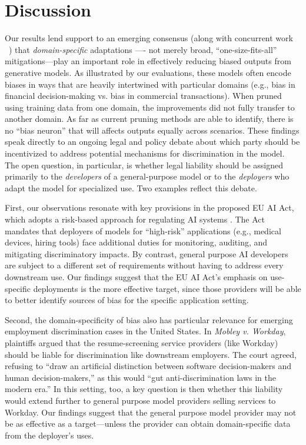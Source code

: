 \documentclass[11pt]{article}
\begin{document}

 









    
\section{Discussion}    

Our results lend support to an emerging consensus (along with concurrent work ~\cite{durmus2024steering}) that \emph{domain-specific} adaptations ---- not merely broad, ``one-size-fits-all'' mitigations---play an important role in effectively reducing biased outputs from generative models.
As illustrated by our evaluations, these models often encode biases in ways that are heavily intertwined with particular domains (e.g., bias in financial decision-making vs. bias in commercial transactions). 
When pruned using training data from one domain, the improvements did not fully transfer to another domain.
As far as current pruning methods are able to identify, there is no ``bias neuron'' that will affects outputs equally across scenarios.
These findings speak directly to an ongoing legal and policy debate about which party should be incentivized to address potential mechanisms for discrimination in the model. 
The open question, in particular, is whether legal liability should be assigned primarily to the \emph{developers} of a general-purpose model or to the \emph{deployers} who adapt the model for specialized use. Two examples reflect this debate.

First, our observations resonate with key provisions in the proposed EU AI Act, which adopts a {risk-based} approach for regulating AI systems \cite{eu2021aiact}. 
The Act mandates that deployers of models for ``high-risk'' applications (e.g., medical devices, hiring tools) face additional duties for monitoring, auditing, and mitigating discriminatory impacts. By contrast, general purpose AI developers are subject to a different set of requirements without having to address every downstream use.
Our findings suggest that the EU AI Act's emphasis on use-specific deployments is the more effective target, since those providers will be able to better identify sources of bias for the specific application setting.

Second, the domain-specificity of bias also has particular relevance for emerging employment discrimination cases in the United States. In \textit{Mobley v. Workday}, plaintiffs argued that the resume-screening service providers (like Workday) should be liable for discrimination like downstream employers. The court agreed, refusing to ``draw an artificial distinction between software decision-makers and human decision-makers,'' as this would ``gut anti-discrimination laws in the modern era.'' In this setting, too, a key question is then whether this liability would extend further to general purpose model providers selling services to Workday. 
Our findings suggest that the general purpose model provider may not be as effective as a target---unless the provider can obtain domain-specific data from the deployer's uses.
\end{document}
